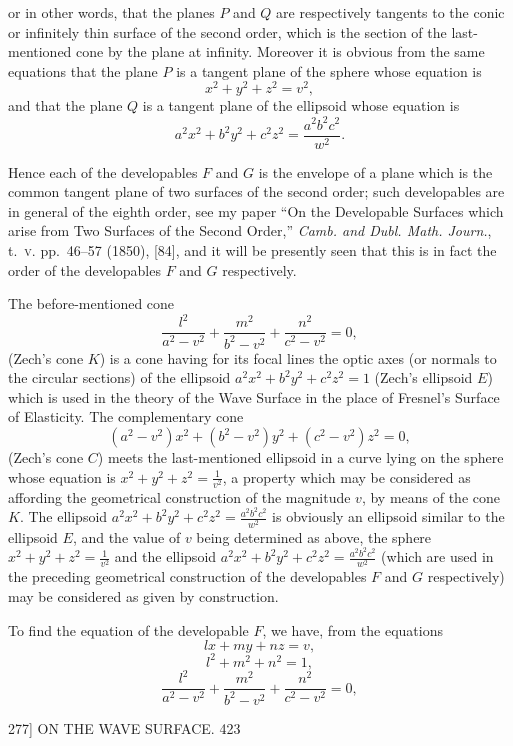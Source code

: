 \documentclass[11pt]{article}
\begin{document}
or in other words, that the planes $P$ and $Q$ are respectively tangents to the conic or
infinitely thin surface of the second order, which is the section of the last-mentioned
cone by the plane at infinity. Moreover it is obvious from the same equations that
the plane $P$ is a tangent plane of the sphere whose equation is
\[ x^{2}+y^{2}+z^{2}=v^{2}, \]
and that the plane $Q$ is a tangent plane of the ellipsoid whose equation is
\[ a^{2}x^{2}+b^{2}y^{2}+c^{2}z^{2}=\frac{a^{2}b^{2}c^{2}}{w^{2}}. \]

Hence each of the developables $F$ and $G$ is the envelope of a plane which is
the common tangent plane of two surfaces of the second order; such developables are
in general of the eighth order, see my paper ``On the Developable Surfaces which
arise from Two Surfaces of the Second Order,'' \textit{Camb. and Dubl. Math. Journ.}, t.~\textsc{v.}
pp.~46--57 (1850), [84], and it will be presently seen that this is in fact the order of
the developables $F$ and $G$ respectively.

The before-mentioned cone
\[ \frac{l^{2}}{a^{2}-v^{2}}+\frac{m^{2}}{b^{2}-v^{2}}+\frac{n^{2}}{c^{2}-v^{2}}=0, \]
(Zech's cone $K$) is a cone having for its focal lines the optic axes (or normals to the
circular sections) of the ellipsoid $a^{2}x^{2}+b^{2}y^{2}+c^{2}z^{2}=1$ (Zech's ellipsoid $E$) which is used
in the theory of the Wave Surface in the place of Fresnel's Surface of Elasticity.
The complementary cone
\[ (a^{2}-v^{2})x^{2}+(b^{2}-v^{2})y^{2}+(c^{2}-v^{2})z^{2}=0, \]
(Zech's cone $C$) meets the last-mentioned ellipsoid in a curve lying on the sphere
whose equation is $x^{2}+y^{2}+z^{2}=\tfrac{1}{v^{2}}$, a property which may be considered as affording the
geometrical construction of the magnitude $v$, by means of the cone $K$. The ellipsoid
$a^{2}x^{2}+b^{2}y^{2}+c^{2}z^{2}=\tfrac{a^{2}b^{2}c^{2}}{w^{2}}$ is obviously an ellipsoid similar to the ellipsoid $E$, and the value of
$v$ being determined as above, the sphere $x^{2}+y^{2}+z^{2}=\tfrac{1}{v^{2}}$ and the ellipsoid $a^{2}x^{2}+b^{2}y^{2}+c^{2}z^{2}=\tfrac{a^{2}b^{2}c^{2}}{w^{2}}$
(which are used in the preceding geometrical construction of the developables $F$ and $G$
respectively) may be considered as given by construction.

To find the equation of the developable $F$, we have, from the equations
\[ lx+my+nz=v, \]
\[ l^{2}+m^{2}+n^{2}=1, \]
\[ \frac{l^{2}}{a^{2}-v^{2}}+\frac{m^{2}}{b^{2}-v^{2}}+\frac{n^{2}}{c^{2}-v^{2}}=0, \]

\begin{center}
\textsc{277]} \hfill ON THE WAVE SURFACE. \hfill 423
\end{center}
\end{document}
